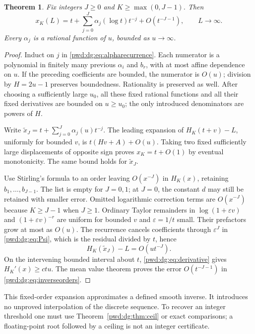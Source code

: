 \documentclass[11pt,letterpaper]{article}
\numberwithin{equation}{section}
\newtheorem{theorem}{Theorem}[section]
\theoremstyle{remark}\newtheorem{remark}[theorem]{Remark}
\newcommand{\eps}{\varepsilon}
\begin{document}
\begin{theorem}\label{pwd:dg:thm:inverseorders}
Fix integers $J\ge0$ and $K\ge\max(0,J-1)$. Then
\begin{equation}\label{pwd:dg:eq:inverseorders}
 x_K(L)=t+\sum_{j=0}^J\alpha_j(\log t)t^{-j}+O(t^{-J-1}),
 \qquad L\to\infty.
\end{equation}
Every $\alpha_j$ is a rational function of $u$, bounded as $u\to\infty$.
\end{theorem}
\begin{proof}
Induct on $j$ in \eqref{pwd:dg:eq:alpharecurrence}. Each numerator is a polynomial in finitely many previous $\alpha_i$ and $b_r$, with at most affine dependence on $u$. If the preceding coefficients are bounded, the numerator is $O(u)$; division by $H=2u-1$ preserves boundedness. Rationality is preserved as well. After choosing a sufficiently large $u_0$, all these fixed rational functions and all their fixed derivatives are bounded on $u\ge u_0$; the only introduced denominators are powers of $H$.

Write $\widetilde x_J=t+\sum_{j=0}^J\alpha_j(u)t^{-j}$. The leading expansion of $H_K(t+v)-L$, uniformly for bounded $v$, is $t(Hv+A)+O(u)$. Taking two fixed sufficiently large displacements of opposite sign proves $x_K=t+O(1)$ by eventual monotonicity. The same bound holds for $\widetilde x_J$.

Use Stirling's formula to an order leaving $O(x^{-J})$ in $H_K(x)$, retaining $b_1,\ldots,b_{J-1}$. The list is empty for $J=0,1$; at $J=0$, the constant $d$ may still be retained with smaller error. Omitted logarithmic correction terms are $O(x^{-J})$ because $K\ge J-1$ when $J\ge1$. Ordinary Taylor remainders in $\log(1+\eps v)$ and $(1+\eps v)^{-r}$ are uniform for bounded $v$ and $\eps=1/t$ small. Their prefactors grow at most as $O(u)$. The recurrence cancels coefficients through $\eps^J$ in \eqref{pwd:dg:eq:Psi}, which is the residual divided by $t$, hence
\[
 H_K(\widetilde x_J)-L=O(ut^{-J}).
\]
On the intervening bounded interval about $t$, \eqref{pwd:dg:eq:derivative} gives $H_K'(x)\ge ctu$. The mean value theorem proves the error $O(t^{-J-1})$ in \eqref{pwd:dg:eq:inverseorders}.
\end{proof}

This fixed-order expansion approximates a defined smooth inverse. It introduces no unproved interpolation of the discrete sequence. To recover an integer threshold one must use Theorem~\ref{pwd:dg:thm:ceil} or exact comparisons; a floating-point root followed by a ceiling is not an integer certificate.
\end{document}

